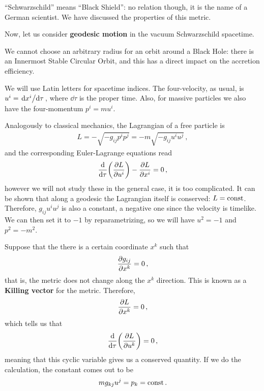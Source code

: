 \documentclass[main.tex]{subfiles}
\begin{document}


``Schwarzschild'' means ``Black Shield'': no relation though, it is the name of a German scientist. 
We have discussed the properties of this metric. 

Now, let us consider \textbf{geodesic motion} in the vacuum Schwarzschild spacetime. 

We cannot choose an arbitrary radius for an orbit around a Black Hole: there is an Innermost Stable Circular Orbit, and this has a direct impact on the accretion efficiency. 

We will use Latin letters for spacetime indices.
The four-velocity, as usual, is \(u^{i} = \dv*{x^{i}}{\tau }\), where \(\dd{\tau }\) is the proper time. 
Also, for massive particles we also have the four-momentum \(p^{i} = m u^{i}\). 

Analogously to classical mechanics, the Lagrangian of a free particle is 
%
\begin{align}
L =- \sqrt{- g_{ij} p^{i} p^{j}} = -m \sqrt{- g_{ij} u^{i} u^{j}}
\,,
\end{align}
%
and the corresponding Euler-Lagrange equations read 
%
\begin{align}
\dv{}{\tau } \qty(\pdv{L}{u^{i}}) - \pdv{L}{x^{i}} = 0
\,,
\end{align}
%
however we will not study these in the general case, it is too complicated. 
It can be shown that along a geodesic the Lagrangian itself is conserved: \(L = \text{const}\). 
Therefore, \(g_{ij} u^{i} u^{j}\) is also a constant, a negative one since the velocity is timelike. We can then set it to \(-1\) by reparametrizing, so we will have \(u^2 = -1\) and \(p^2= -m^2\). 

Suppose that the there is a certain coordinate \(x^{k}\) such that 
%
\begin{align}
\pdv{g_{ij}}{x^{k}} = 0
\,,
\end{align}
%
that is, the metric does not change along the \(x^{k}\) direction. This is known as a \textbf{Killing vector} for the metric.
Therefore, 
%
\begin{align}
\pdv{L}{x^{k}} =0
\,,
\end{align}
%
which tells us that 
%
\begin{align}
\dv{}{\tau } \qty(\pdv{L}{ u^{k}}) = 0
\,,
\end{align}
%
meaning that this cyclic variable gives us a conserved quantity. If we do the calculation, the constant comes out to be
%
\begin{align}
m g_{kj} u^{j} = p_k =  \text{const}
\,.
\end{align}
\end{document}
